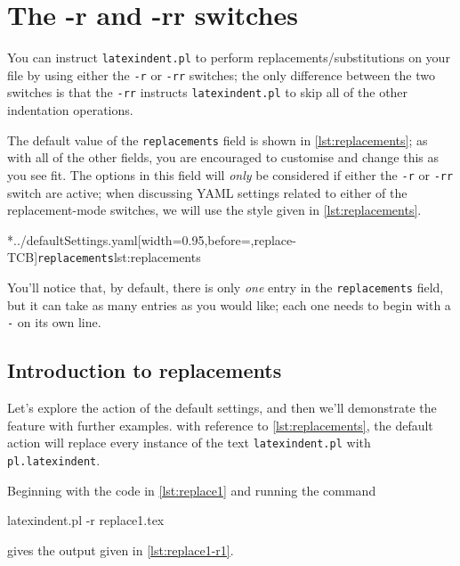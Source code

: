 \section{The -r and -rr switches}\label{sec:replacements}

 You can instruct \texttt{latexindent.pl} to perform replacements/substitutions on your
 file by using either the \texttt{-r} or \texttt{-rr} switches; the
 only difference between the two switches is that the \texttt{-rr} instructs
 \texttt{latexindent.pl} to skip all of the other indentation operations.

 The default value of the \texttt{replacements} field is shown in
 \cref{lst:replacements}; as with all of the other fields, you are encouraged to customise
 and change this as you see fit. The options in this field will \emph{only} be
 considered if either the \texttt{-r} or \texttt{-rr} switch are
 active; when discussing YAML settings related to either of the replacement-mode switches,
 we will use the style given in \cref{lst:replacements}.

 \cmhlistingsfromfile*[style=replacements]*{../defaultSettings.yaml}[width=0.95\linewidth,before=\centering,replace-TCB]{\texttt{replacements}}{lst:replacements}

 You'll notice that, by default, there is only \emph{one} entry in the
 \texttt{replacements} field, but it can take as many entries as you would like; each
 one needs to begin with a \texttt{-} on its own line.

\subsection{Introduction to replacements}
	Let's explore the action of the default settings, and then we'll demonstrate the feature
	with further examples. with reference to \cref{lst:replacements}, the default action will
	replace every instance of the text \texttt{latexindent.pl} with \texttt{pl.latexindent}.

	Beginning with the code in \cref{lst:replace1} and running the command
	\begin{commandshell}
latexindent.pl -r replace1.tex
\end{commandshell}
	gives the output given in \cref{lst:replace1-r1}.

	\begin{cmhtcbraster}[raster column skip=.01\linewidth]
	\end{cmhtcbraster}

